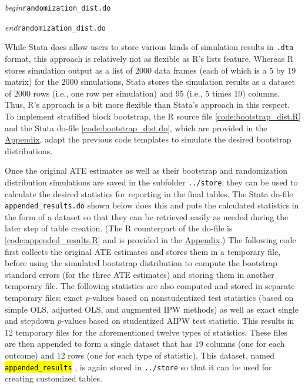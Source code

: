 \documentclass[12pt]{article}
\newcommand{\hlc}[2][yellow]{{%
    \colorlet{foo}{#1}%
    \sethlcolor{foo}\hl{#2}}%
}
\newcommand{\ctext}[1]{\hlc[teal!20]{\texttt{#1}}}
\begin{document}
\vspace{7mm}

\lstset{basicstyle=\scriptsize\ttfamily,breaklines=true}

\noindent \textit{begin}\quad \texttt{randomization\_dist.do}

\vspace{-3mm}
\noindent \textit{end}\quad \texttt{randomization\_dist.do}

\vspace{5mm}

While Stata does allow users to store various kinds of simulation results in \texttt{.dta} format, this approach is relatively not as flexible as R's lists feature. Whereas R stores simulation output as a list of 2000 data frames (each of which is a 5 by 19 matrix) for the 2000 simulations, Stata stores the simulation results as a dataset of 2000 rows (i.e., one row per simulation) and 95 (i.e., 5 times 19) columns. Thus, R's approach is a bit more flexible than Stata's approach in this respect. To implement stratified block bootstrap, the R source file \ref{code:bootstrap_dist.R} and the Stata do-file \ref{code:bootstrap_dist.do}, which are provided in the \hyperref[sec:appendix]{Appendix}, adapt the previous code templates to simulate the desired bootstrap distributions.

Once the original ATE estimates as well as their bootstrap and randomization distribution simulations are saved in the subfolder \texttt{../store}, they can be used to calculate the desired statistics for reporting in the final tables. The Stata do-file \texttt{appended\_results.do} shown below does this and puts the calculated statistics in the form of a dataset so that they can be retrieved easily as needed during the later step of table creation. (The R counterpart of the do-file is \ref{code:appended_results.R} and is provided in the \hyperref[sec:appendix]{Appendix}.)  The following code first collects the original ATE estimates and stores them in a temporary file, before using the simulated bootstrap distribution to compute the bootstrap standard errors (for the three ATE estimates) and storing them in another temporary file. The following statistics are also computed and stored in separate temporary files: exact $p$-values based on nonstudentized test statistics (based on simple OLS, adjusted OLS, and augmented IPW methods) as well as exact single and stepdown $p$-values based on studentized AIPW test statistic. This results in 12 temporary files for the aforementioned twelve types of statistics. These files are then appended to form a single dataset that has 19 columns (one for each outcome) and 12 rows (one for each type of statistic). This dataset, named \ctext{appended\_results}, is again stored in \texttt{../store} so that it can be used for creating customized tables.
\end{document}
